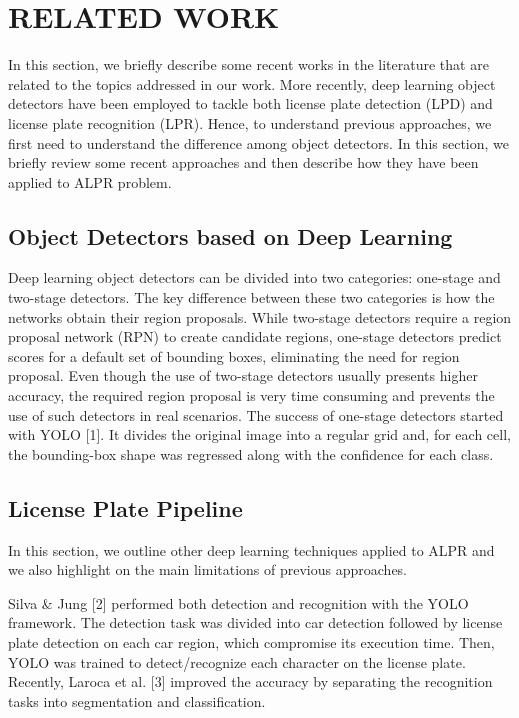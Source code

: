 \documentclass[letterpaper,12pt]{article}
\begin{document}
\section{RELATED WORK}
In this section, we briefly describe some recent works in the literature that are related to the topics addressed in our work. More recently, deep learning object detectors have been employed to tackle both license plate detection (LPD) and license plate recognition (LPR). Hence, to understand previous approaches, we first need to understand the difference among
object detectors. In this section, we briefly review some recent approaches and then describe how they have been applied to
ALPR problem.

\subsection{Object Detectors based on Deep Learning}
Deep learning object detectors can be divided into two categories: one-stage and two-stage detectors. The key difference
between these two categories is how the networks obtain their region proposals. While two-stage detectors require a region
proposal network (RPN) to create candidate regions, one-stage detectors predict scores for a default set of bounding boxes,
eliminating the need for region proposal. Even though the use of two-stage detectors usually presents higher accuracy, the
required region proposal is very time consuming and prevents the use of such detectors in real scenarios. The success of one-stage detectors started with YOLO [1]. It divides the original image into a regular grid and, for each
cell, the bounding-box shape was regressed along with the confidence for each class.

\subsection{License Plate Pipeline}
In this section, we outline other deep learning techniques applied to ALPR and we also highlight on the main limitations
of previous approaches.

Silva \& Jung [2] performed both detection and recognition with the YOLO framework. The detection task was divided into car detection followed by license plate detection on each car region, which compromise its execution time. Then, YOLO was trained to detect/recognize each character on the license plate. Recently, Laroca et al. [3] improved the accuracy by separating the recognition tasks into segmentation and classification.
\end{document}
